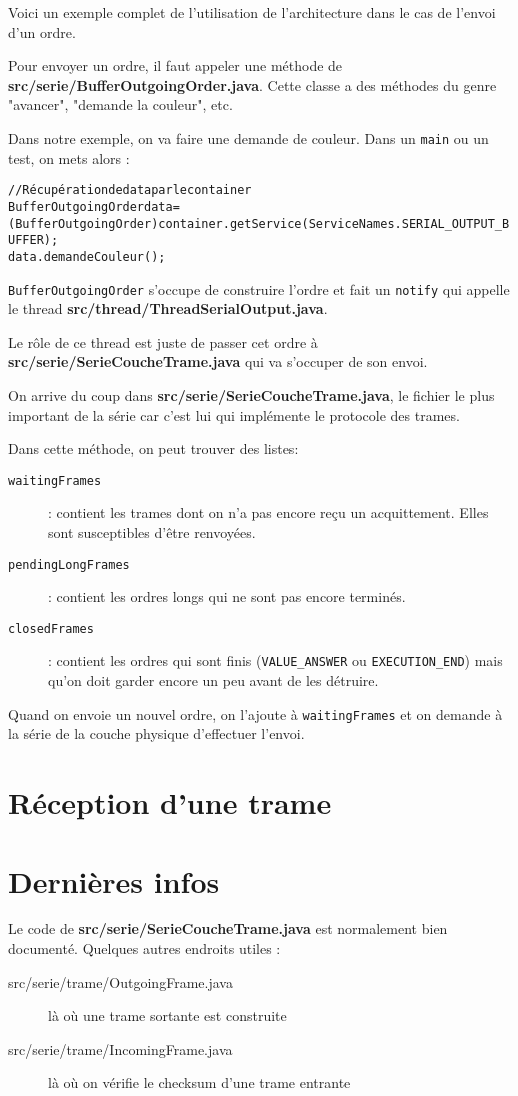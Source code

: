 \documentclass[a4paper, 12pt]{article}
\begin{document}
Voici un exemple complet de l'utilisation de l'architecture dans le cas de l'envoi d'un ordre.

Pour envoyer un ordre, il faut appeler une méthode de \textbf{src/serie/BufferOutgoingOrder.java}. Cette classe a des méthodes du genre "avancer", "demande la couleur", etc.

Dans notre exemple, on va faire une demande de couleur. Dans un \texttt{main} ou un test, on mets alors :

\begin{alltt}
// Récupération de data par le container
BufferOutgoingOrder data = (BufferOutgoingOrder) container.getService(ServiceNames.SERIAL_OUTPUT_BUFFER);
data.demandeCouleur();
\end{alltt}

\texttt{BufferOutgoingOrder} s'occupe de construire l'ordre et fait un \texttt{notify} qui appelle le thread \textbf{src/thread/ThreadSerialOutput.java}.

Le rôle de ce thread est juste de passer cet ordre à \textbf{src/serie/SerieCoucheTrame.java} qui va s'occuper de son envoi.

On arrive du coup dans \textbf{src/serie/SerieCoucheTrame.java}, le fichier le plus important de la série car c'est lui qui implémente le protocole des trames.

Dans cette méthode, on peut trouver des listes:

\begin{description}
\item[\texttt{waitingFrames}] : contient les trames dont on n'a pas encore reçu un acquittement. Elles sont susceptibles d'être renvoyées.
\item[\texttt{pendingLongFrames}] : contient les ordres longs qui ne sont pas encore terminés.
\item[\texttt{closedFrames}] : contient les ordres qui sont finis (\texttt{VALUE\_ANSWER} ou \texttt{EXECUTION\_END}) mais qu'on doit garder encore un peu avant de les détruire.
\end{description}

Quand on envoie un nouvel ordre, on l'ajoute à \texttt{waitingFrames} et on demande à la série de la couche physique d'effectuer l'envoi.

\section{Réception d'une trame}



\section{Dernières infos}

Le code de \textbf{src/serie/SerieCoucheTrame.java} est normalement bien documenté. Quelques autres endroits utiles :

\begin{description}
\item[src/serie/trame/OutgoingFrame.java] là où une trame sortante est construite
\item[src/serie/trame/IncomingFrame.java] là où on vérifie le checksum d'une trame entrante
\end{description}
\end{document}
